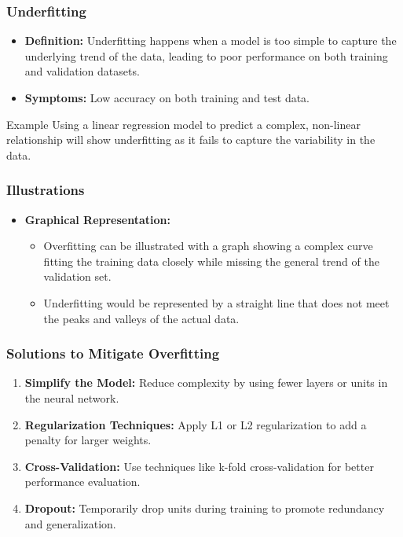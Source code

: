 \documentclass[aspectratio=169]{beamer}
\begin{document}
\begin{frame}[fragile]
    \frametitle{Underfitting}
    \begin{itemize}
        \item \textbf{Definition:} Underfitting happens when a model is too simple to capture the underlying trend of the data, leading to poor performance on both training and validation datasets.
        \item \textbf{Symptoms:} Low accuracy on both training and test data.
    \end{itemize}
    \begin{block}{Example}
        Using a linear regression model to predict a complex, non-linear relationship will show underfitting as it fails to capture the variability in the data.
    \end{block}
\end{frame}

\begin{frame}[fragile]
    \frametitle{Illustrations}
    \begin{itemize}
        \item \textbf{Graphical Representation:} 
        \begin{itemize}
            \item Overfitting can be illustrated with a graph showing a complex curve fitting the training data closely while missing the general trend of the validation set.
            \item Underfitting would be represented by a straight line that does not meet the peaks and valleys of the actual data.
        \end{itemize}
    \end{itemize}
\end{frame}

\begin{frame}[fragile]
    \frametitle{Solutions to Mitigate Overfitting}
    \begin{enumerate}
        \item \textbf{Simplify the Model:} Reduce complexity by using fewer layers or units in the neural network.
        \item \textbf{Regularization Techniques:} Apply L1 or L2 regularization to add a penalty for larger weights.
        \item \textbf{Cross-Validation:} Use techniques like k-fold cross-validation for better performance evaluation.
        \item \textbf{Dropout:} Temporarily drop units during training to promote redundancy and generalization.
    \end{enumerate}
\end{frame}
\end{document}
